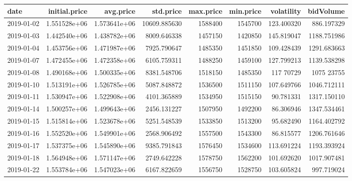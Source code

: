 \documentclass[10pt,a4paper]{article}
\begin{document}
			
	\begin{table}
		\centering
		\begin{tiny}
			{
				\begin{tabular}{lrrrrrrr}
					\textbf{date} &   \textbf{ initial.price} &    \textbf{avg.price} &     \textbf{std.price} &  \textbf{max.price} &  \textbf{min.price} &   \textbf{volatility} &    \textbf{bidVolume} \\ 
					\hline		
					2019-01-02 &   1.551528e+06 &  1.573641e+06 &  10609.885630 &  1588400   &  1545700   &      123.400320 &   886.197329 \\
					2019-01-03 &   1.442540e+06 &  1.438782e+06 &   8009.646338 &  1457150   &  1420850   &       145.819047 &  1188.751986 \\
					2019-01-04 &   1.453756e+06 &  1.471987e+06 &   7925.790647 &  1485350   &  1451850   &       109.428439 &  1291.683663 \\
					2019-01-07 &   1.472455e+06 &  1.472358e+06 &   6105.759311 &  1488250   &  1459100   &       127.799213 &  1139.538298 \\
					2019-01-08 &   1.490168e+06 &  1.500335e+06 &   8381.548706 &  1518150   &  1485350   &      117  70729 &  1075  23755 \\
					2019-01-10 &   1.513191e+06 &  1.526785e+06 &   5087.848872 &  1536500   &  1511150   &       107.649766 &  1046.712111 \\
					2019-01-11 &   1.530947e+06 &  1.522908e+06 &   4101.365889 &  1534950   &  1515150   &      90.781331 &  1317.150110 \\ 
					2019-01-14 &   1.500257e+06 &  1.499643e+06 &   2456.131227 &  1507950   &  1492200   &     86.306946 &  1347.534461 \\
					2019-01-15 &   1.515814e+06 &  1.523678e+06 &   5251.548539 &  1533850   &  1513200   &     95.682490 &  1164.402792 \\
					2019-01-16 &   1.552520e+06 &  1.549901e+06 &   2568.906492 &  1557500   &  1543300   &      86.815577 &  1206.761646 \\
					2019-01-17 &   1.537375e+06 &  1.545890e+06 &   9385.791843 &  1576450   &  1534600   &   113.691224 &  1193.393924 \\
					2019-01-18 &   1.564948e+06 &  1.571147e+06 &   2749.642228 &  1578750   &  1562200   &       101.692620 &  1017.907481 \\
					2019-01-22 &   1.553784e+06 &  1.547023e+06 &   6167.822659 &  1556750   &  1528750   &      103.605824 &   997.719024 \\

\end{tabular}}
\end{tiny}
\end{table}
\end{document}
